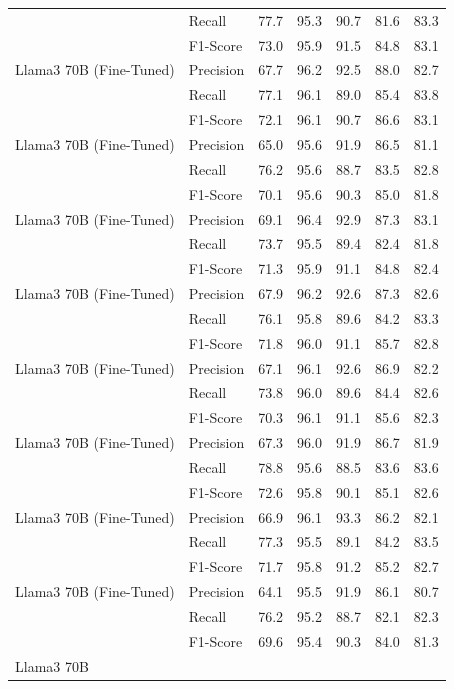 \begin{table}[!ht]
\begin{tabular}{llrrrrr}
 & Recall & 77.7 & 95.3 & 90.7 & 81.6 & 83.3 \\
 & F1-Score & 73.0 & 95.9 & 91.5 & 84.8 & 83.1 \\
\midrule
Llama3 70B
(Fine-Tuned) & Precision & 67.7 & 96.2 & 92.5 & 88.0 & 82.7 \\
 & Recall & 77.1 & 96.1 & 89.0 & 85.4 & 83.8 \\
 & F1-Score & 72.1 & 96.1 & 90.7 & 86.6 & 83.1 \\
\midrule
Llama3 70B
(Fine-Tuned) & Precision & 65.0 & 95.6 & 91.9 & 86.5 & 81.1 \\
 & Recall & 76.2 & 95.6 & 88.7 & 83.5 & 82.8 \\
 & F1-Score & 70.1 & 95.6 & 90.3 & 85.0 & 81.8 \\
\midrule
Llama3 70B
(Fine-Tuned) & Precision & 69.1 & 96.4 & 92.9 & 87.3 & 83.1 \\
 & Recall & 73.7 & 95.5 & 89.4 & 82.4 & 81.8 \\
 & F1-Score & 71.3 & 95.9 & 91.1 & 84.8 & 82.4 \\
\midrule
Llama3 70B
(Fine-Tuned) & Precision & 67.9 & 96.2 & 92.6 & 87.3 & 82.6 \\
 & Recall & 76.1 & 95.8 & 89.6 & 84.2 & 83.3 \\
 & F1-Score & 71.8 & 96.0 & 91.1 & 85.7 & 82.8 \\
\midrule
Llama3 70B
(Fine-Tuned) & Precision & 67.1 & 96.1 & 92.6 & 86.9 & 82.2 \\
 & Recall & 73.8 & 96.0 & 89.6 & 84.4 & 82.6 \\
 & F1-Score & 70.3 & 96.1 & 91.1 & 85.6 & 82.3 \\
\midrule
Llama3 70B
(Fine-Tuned) & Precision & 67.3 & 96.0 & 91.9 & 86.7 & 81.9 \\
 & Recall & 78.8 & 95.6 & 88.5 & 83.6 & 83.6 \\
 & F1-Score & 72.6 & 95.8 & 90.1 & 85.1 & 82.6 \\
\midrule
Llama3 70B
(Fine-Tuned) & Precision & 66.9 & 96.1 & 93.3 & 86.2 & 82.1 \\
 & Recall & 77.3 & 95.5 & 89.1 & 84.2 & 83.5 \\
 & F1-Score & 71.7 & 95.8 & 91.2 & 85.2 & 82.7 \\
\midrule
Llama3 70B
(Fine-Tuned) & Precision & 64.1 & 95.5 & 91.9 & 86.1 & 80.7 \\
 & Recall & 76.2 & 95.2 & 88.7 & 82.1 & 82.3 \\
 & F1-Score & 69.6 & 95.4 & 90.3 & 84.0 & 81.3 \\
\midrule
Llama3 70B

\end{tabular}
\end{table}
